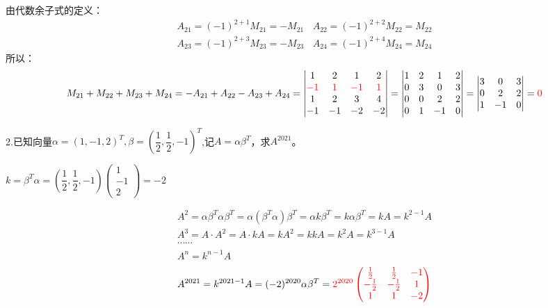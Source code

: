 \documentclass{article}
\begin{document}
\begin{jie}
由代数余子式的定义：
\begin{gather*}
A_{21}=(-1)^{2+1}M_{21}=-M_{21}~~~~A_{22}=(-1)^{2+2}M_{22}=M_{22}\\
A_{23}=(-1)^{2+3}M_{23}=-M_{23}~~~~A_{24}=(-1)^{2+4}M_{24}=M_{24}
\end{gather*}
所以：
\begin{equation*}
M_{21}+M_{22}+M_{23}+M_{24}=-A_{21}+A_{22}-A_{23}+A_{24}=
\begin{vmatrix}
  1 & 2 & 1 & 2\\
  \textcolor[rgb]{1.00,0.00,0.00}{-1} & \textcolor[rgb]{1.00,0.00,0.00}{1}&\textcolor[rgb]{1.00,0.00,0.00}{-1} & \textcolor[rgb]{1.00,0.00,0.00}{1}\\
  1 & 2 &3 & 4\\
  -1 & -1 &-2&-2
\end{vmatrix}=
\begin{vmatrix}
 1 & 2 & 1 & 2\\
  0 & 3&0 & 3\\
  0 & 0 &2 & 2\\
  0 & 1 &-1&0
\end{vmatrix}=
\begin{vmatrix}
 3&0 & 3\\
 0 &2 & 2\\
 1 &-1&0
\end{vmatrix}=\textcolor[rgb]{1.00,0.00,0.00}{0}
\end{equation*}
\end{jie}

2.已知向量$\alpha=(1,-1,2)^{T},\beta=(\dfrac{1}{2},\dfrac{1}{2},-1)^{T}$,记$A=\alpha\beta^T$，求$A^{2021}$。

\begin{jie}
$k=\beta^T\alpha=(\dfrac{1}{2},\dfrac{1}{2},-1)
\begin{pmatrix}
1\\ -1\\ 2
\end{pmatrix}=-2$

\begin{gather*}
A^{2}=\alpha\beta^T\alpha\beta^T=\alpha(\beta^T\alpha)\beta^T=\alpha k\beta^T=k\alpha\beta^T=kA=k^{2-1}A\\
A^3=A\cdot A^2=A\cdot kA=kA^{2}=kkA=k^2A=k^{3-1}A\\
\cdots\cdots\\
A^n=k^{n-1}A
\end{gather*}
\begin{equation*}
A^{2021}=k^{2021-1}A=(-2)^{2020}\alpha\beta^T=\textcolor[rgb]{1.00,0.00,0.00}{2^{2020}
\begin{pmatrix}
\frac{1}{2}&\frac{1}{2}&-1 \\
-\frac{1}{2}&-\frac{1}{2}&1\\
1&1&-2
\end{pmatrix}}
\end{equation*}
\end{jie}
\end{document}
